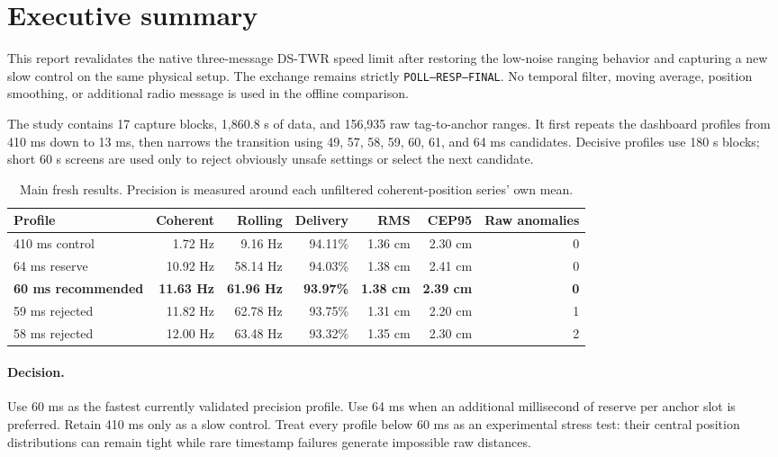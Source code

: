 \documentclass[11pt,a4paper]{article}
\newcommand{\dstwr}{DS-TWR}
\begin{document}
\tableofcontents
\clearpage
{}

\section{Executive summary}

This report revalidates the native three-message \dstwr{} speed limit after
restoring the low-noise ranging behavior and capturing a new slow control on
the same physical setup. The exchange remains strictly
\texttt{POLL--RESP--FINAL}. No temporal filter, moving average, position
smoothing, or additional radio message is used in the offline comparison.

The study contains 17 capture blocks, 1,860.8 s of data, and 156,935 raw
tag-to-anchor ranges. It first repeats the dashboard profiles from 410 ms down
to 13 ms, then narrows the transition using 49, 57, 58, 59, 60, 61, and
64 ms candidates. Decisive profiles use 180 s blocks; short 60 s screens are
used only to reject obviously unsafe settings or select the next candidate.

\begin{table}[H]
  \centering
  \caption{Main fresh results. Precision is measured around each unfiltered
  coherent-position series' own mean.}
  \small
  \begin{tabular}{lrrrrrr}
    \toprule
    Profile & Coherent & Rolling & Delivery & RMS & CEP95 & Raw anomalies\\
    \midrule
    410 ms control & 1.72 Hz & 9.16 Hz & 94.11\% & 1.36 cm & 2.30 cm & 0\\
    64 ms reserve & 10.92 Hz & 58.14 Hz & 94.03\% & 1.38 cm & 2.41 cm & 0\\
    \textcolor{acceptedgreen}{\textbf{60 ms recommended}}
      & \textbf{11.63 Hz} & \textbf{61.96 Hz} & \textbf{93.97\%}
      & \textbf{1.38 cm} & \textbf{2.39 cm} & \textbf{0}\\
    \textcolor{rejectedred}{59 ms rejected}
      & 11.82 Hz & 62.78 Hz & 93.75\% & 1.31 cm & 2.20 cm & 1\\
    \textcolor{rejectedred}{58 ms rejected}
      & 12.00 Hz & 63.48 Hz & 93.32\% & 1.35 cm & 2.30 cm & 2\\
    \bottomrule
  \end{tabular}
\end{table}

\paragraph{Decision.}
Use 60 ms as the fastest currently validated precision profile. Use 64 ms
when an additional millisecond of reserve per anchor slot is preferred.
Retain 410 ms only as a slow control. Treat every profile below 60 ms as an
experimental stress test: their central position distributions can remain
tight while rare timestamp failures generate impossible raw distances.
\end{document}
